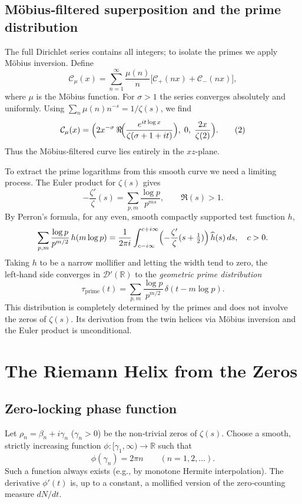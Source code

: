 \documentclass[12pt,a4paper]{article}
\newcommand{\R}{\mathbb{R}}
\newcommand{\dist}{\mathcal{D}'}
\begin{document}
\subsection{M\"obius‑filtered superposition and the prime distribution}
The full Dirichlet series contains all integers; to isolate the primes we apply M\"obius inversion.  Define
\[
\mathcal{C}_\mu(x) = \sum_{n=1}^{\infty} \frac{\mu(n)}{n} \bigl[ \mathcal{C}_+(n x) + \mathcal{C}_-(n x) \bigr],
\]
where $\mu$ is the M\"obius function.  For $\sigma > 1$ the series converges absolutely and uniformly.  Using $\sum_{n}\mu(n)n^{-s}=1/\zeta(s)$, we find
\[
\mathcal{C}_\mu(x) = \Bigl( 2x^{-\sigma}\,\Re\!\Bigl( \frac{e^{i t\log x}}{\zeta(\sigma+1+it)} \Bigr),\; 0,\; \frac{2x}{\zeta(2)} \Bigr). \tag{2}
\]
Thus the M\"obius‑filtered curve lies entirely in the $xz$-plane.

To extract the prime logarithms from this smooth curve we need a limiting process.  The Euler product for $\zeta(s)$ gives
\[
-\frac{\zeta'}{\zeta}(s) = \sum_{p,m} \frac{\log p}{p^{m s}}, \qquad \Re(s)>1 .
\]
By Perron's formula, for any even, smooth compactly supported test function $h$,
\[
\sum_{p,m}\frac{\log p}{p^{m/2}}\,h(m\log p) = \frac{1}{2\pi i}\int_{c-i\infty}^{c+i\infty} \Bigl(-\frac{\zeta'}{\zeta}(s+\tfrac12)\Bigr)\,\widehat{h}(s)\,ds,\quad c>0 .
\]
Taking $h$ to be a narrow mollifier and letting the width tend to zero, the left‑hand side converges in $\dist(\R)$ to the \emph{geometric prime distribution}
\[
\tau_{\text{prime}}(t) = \sum_{p,m} \frac{\log p}{p^{m/2}} \, \delta(t - m\log p). \tag{3}
\]
This distribution is completely determined by the primes and does not involve the zeros of $\zeta(s)$.  Its derivation from the twin helices via M\"obius inversion and the Euler product is unconditional.

\section{The Riemann Helix from the Zeros}

\subsection{Zero‑locking phase function}
Let $\rho_n = \beta_n + i\gamma_n$ ($\gamma_n>0$) be the non‑trivial zeros of $\zeta(s)$.  Choose a smooth, strictly increasing function $\phi:[\gamma_1,\infty)\to\R$ such that
\[
\phi(\gamma_n) = 2\pi n \qquad (n=1,2,\dots).
\]
Such a function always exists (e.g., by monotone Hermite interpolation).  The derivative $\phi'(t)$ is, up to a constant, a mollified version of the zero‑counting measure $dN/dt$.
\end{document}
